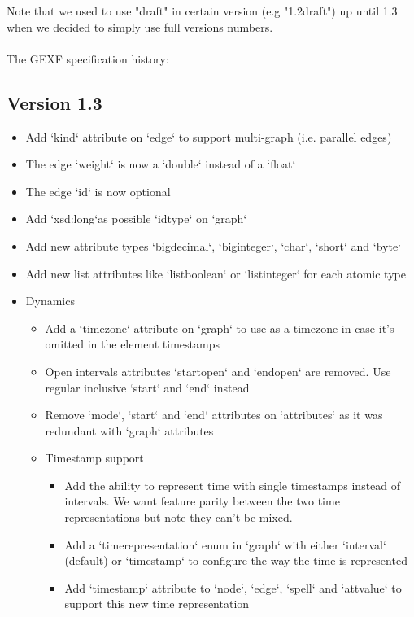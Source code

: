 \documentclass[a4paper,10pt]{article}
\begin{document}
Note that we used to use "draft" in certain version (e.g "1.2draft") up until 1.3 when we decided to simply use full versions numbers.

\paragraph{}
The GEXF specification history:

\subsection*{Version 1.3}

\begin{itemize}
\item Add `kind` attribute on `edge` to support multi-graph (i.e. parallel edges)
\item The edge `weight` is now a `double` instead of a `float`
\item The edge `id` is now optional
\item Add `xsd:long`as possible `idtype` on `\<graph\>`
\item Add new attribute types `bigdecimal`, `biginteger`, `char`, `short` and `byte`
\item Add new list attributes like `listboolean` or `listinteger` for each atomic type
\item Dynamics
\begin{itemize}
\item Add a `timezone` attribute on `\<graph\>` to use as a timezone in case it's omitted in the element timestamps
\item Open intervals attributes `startopen` and `endopen` are removed. Use regular inclusive `start` and `end` instead
\item Remove `mode`, `start` and `end` attributes on `\<attributes\>` as it was redundant with `\<graph\>` attributes
\item Timestamp support
\begin{itemize}
\item Add the ability to represent time with single timestamps instead of intervals. We want feature parity between the two time representations but note they can't be mixed.
\item Add a `timerepresentation` enum in `\<graph\>` with either `interval` (default) or `timestamp` to configure the way the time is represented
\item Add `timestamp` attribute to `\<node\>`, `\<edge\>`, `\<spell\>` and `\<attvalue\>` to support this new time representation

\end{itemize}
\end{itemize}
\end{itemize}
\end{document}
